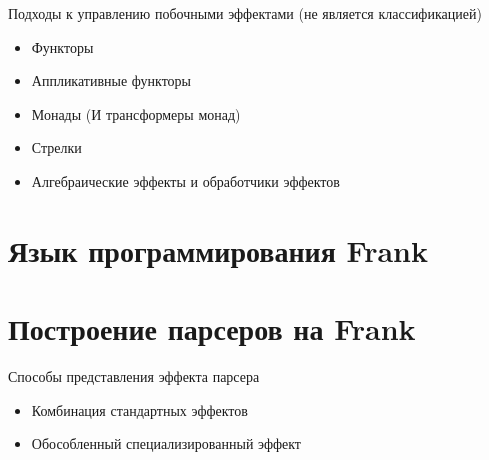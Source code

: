 \begin{frame}{Подходы к управлению побочными эффектами (не является классификацией)}
\begin{itemize}
  \item Функторы
  \item Аппликативные функторы
  \item Монады (И трансформеры монад)
  \item Стрелки
  \item Алгебраические эффекты и обработчики эффектов
\end{itemize}
\end{frame}


\section{Язык программирования Frank}




\section{Построение парсеров на Frank}

\begin{frame}{Способы представления эффекта парсера}
  \begin{itemize}
    \item Комбинация стандартных эффектов
    \item Обособленный специализированный эффект
  \end{itemize}
\end{frame}






